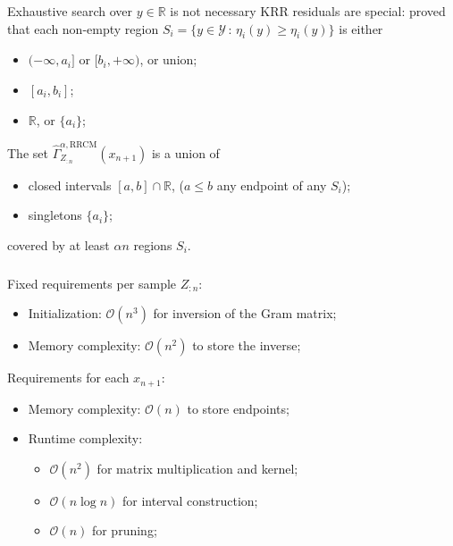\documentclass[t]{beamer}  %
\newcommand{\Ycal}{\mathcal{Y}}
\newcommand{\Ocal}{\mathcal{O}}
\newcommand{\Real}{\mathbb{R}}
\begin{document}
\begin{frame}[c]\frametitle{\insertsection}
  \framesubtitle{\insertsubsection}
  \begin{block}{Exhaustive search over $y\in \Real$ is not necessary}
    KRR residuals are special: proved that each non-empty region
    $S_i = \{y \in \Ycal \,:\, \eta_i(y) \geq \eta_i(y)\}$
    is either \begin{itemize}
      \item $(-\infty, a_i]$ or $[b_i, +\infty)$, or union;
      \item $[a_i, b_i]$;
      \item $\Real$, or $\{a_i\}$;
    \end{itemize}
    \vspace{\baselineskip}
    The set $\hat{\Gamma}_{Z_{:n}}^{\alpha, \text{RRCM}}(x_{n+1})$ is a union of
    \begin{itemize}
      \item closed intervals $[a, b]\cap\Real$, ($a\leq b$ any endpoint of any $S_i$);
      \item singletons $\{a_i\}$;
    \end{itemize}
    covered by at least $\alpha n$ regions $S_i$.
  \end{block}
\end{frame}

\begin{frame}[c]\frametitle{\insertsection}
\framesubtitle{\insertsubsection}
  Fixed requirements per sample $Z_{:n}$: \begin{itemize}
    \item Initialization: $\Ocal(n^3)$ for inversion of the Gram matrix;
    \item Memory complexity: $\Ocal(n^2)$ to store the inverse;
  \end{itemize}
  \vspace{\baselineskip}
  Requirements for each $x_{n+1}$:
  \begin{itemize}
    \item Memory complexity: $\Ocal(n)$ to store endpoints;
    \item Runtime complexity: \begin{itemize}
      \item $\Ocal(n^2)$ for matrix multiplication and kernel;
      \item $\Ocal(n \log n)$ for interval construction;
      \item $\Ocal(n)$ for pruning;
    \end{itemize}
  \end{itemize}
\end{frame}
\end{document}
